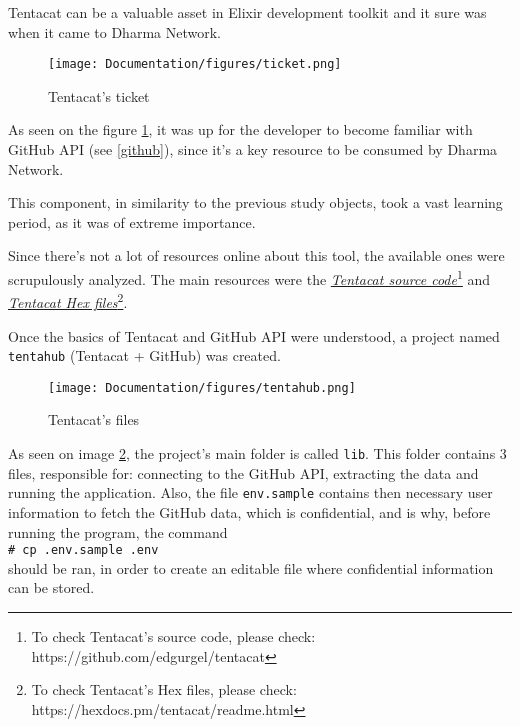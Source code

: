 Tentacat can be a valuable asset in Elixir development toolkit and it sure was when it came to Dharma Network.

\begin{figure}[htbp]
	\centering
	\texttt{[image: Documentation/figures/ticket.png]}  %
	\caption{Tentacat's ticket}
	\label{fig:ticket}
\end{figure}

As seen on the figure \ref{fig:ticket}, it was up for the developer to become familiar with GitHub API (see \ref{github}), since it's a key resource to be consumed by Dharma Network.

This component, in similarity to the previous study objects, took a vast learning period, as it was of extreme importance.\newline

Since there's not a lot of resources online about this tool, the available ones were scrupulously analyzed. The main resources were the \href{https://github.com/edgurgel/tentacat}{\textit{Tentacat source code}}\footnote{To check Tentacat's source code, please check: https://github.com/edgurgel/tentacat} and \href{https://hexdocs.pm/tentacat/readme.html}{\textit{Tentacat Hex files}}\footnote{To check Tentacat's Hex files, please check: https://hexdocs.pm/tentacat/readme.html}. \newline

Once the basics of Tentacat and GitHub API were understood, a project named \texttt{tentahub} (Tentacat + GitHub) was created.

\begin{figure}[htbp]
	\centering
	\texttt{[image: Documentation/figures/tentahub.png]}  %
	\caption{Tentacat's files}
	\label{fig:tent}
\end{figure}

As seen on image \ref{fig:tent}, the project's main folder is called \texttt{lib}. This folder contains 3 files, responsible for: connecting to the GitHub API, extracting the data and running the application. Also, the file \texttt{env.sample} contains then necessary user information to fetch the GitHub data, which is confidential, and is why, before running the program, the command {
\newcommand{\shellcmd}[1]{\\\indent\indent\texttt{\footnotesize\# #1}\\}
  \shellcmd{cp .env.sample .env}
}should be ran, in order to create an editable file where confidential information can be stored.\newline


